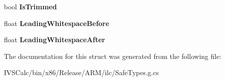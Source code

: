 \begin{DoxyCompactItemize}
bool {\bfseries Is\+Trimmed}
\item 
\mbox{\label{struct_microsoft_1_1_graphics_1_1_canvas_1_1_text_1_1_canvas_line_metrics_a3ae52d68c582611b204b9de2178774c0}} 
float {\bfseries Leading\+Whitespace\+Before}
\item 
\mbox{\label{struct_microsoft_1_1_graphics_1_1_canvas_1_1_text_1_1_canvas_line_metrics_a891ba9fc791f7fe4d4c3976bb3e62585}} 
float {\bfseries Leading\+Whitespace\+After}
\end{DoxyCompactItemize}


The documentation for this struct was generated from the following file\+:\begin{DoxyCompactItemize}
\item 
I\+V\+S\+Calc/bin/x86/\+Release/\+A\+R\+M/ilc/Safe\+Types.\+g.\+cs\end{DoxyCompactItemize}
